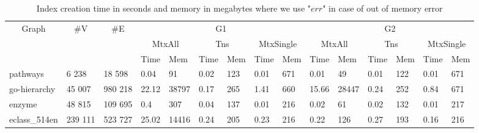 {\setlength{\tabcolsep}{0.25em}
	\begin{table}[t]
		{
			\caption{Index creation time in seconds and memory in megabytes where we use "$err$" in case of out of memory error }
			\label{tbl:index_creation}
			\small
			\begin{tabular}{|l|l|l|l|l|l|l|l|l|l|l|l|l|l|l|}
				\hline
				\multicolumn{1}{|c}{\multirow{3}{*}{Graph}} &
				\multicolumn{1}{|c}{\multirow{3}{*}{\#V}} &
				\multicolumn{1}{|c|}{\multirow{3}{*}{\#E}} & \multicolumn{6}{c|}{G1}                                                           & \multicolumn{6}{c|}{G2}                                                                                                               \\ \cline{4-15}
				\multicolumn{1}{|c}{}                       &
				\multicolumn{1}{|c}{}                       &
				\multicolumn{1}{|c|}{}                       & \multicolumn{2}{c|}{MtxAll} & \multicolumn{2}{c|}{Tns} & \multicolumn{2}{c|}{MtxSingle} & \multicolumn{2}{c|}{MtxAll} & \multicolumn{2}{c|}{Tns} & \multicolumn{2}{c|}{MtxSingle} \\ \cline{4-15}
				\multicolumn{1}{|c}{}                       &
				\multicolumn{1}{|c}{}                       &
				\multicolumn{1}{|c|}{}                       & Time          & Mem         & Time        & Mem        & Time        & Mem        & Time          & Mem         & Time        & Mem        & Time        & Mem     \\ \hline \hline
				pathways  & 6 238 & 18 598                                   & 0.04          & 91          & 0.02        & 123        & 0.01        & 671        & 0.01          & 49          & 0.01        & 122        & 0.01        & 671   \\ \hline
				go-hierarchy & 45 007 & 980 218                                & 22.12         & 38797       & 0.17        & 265        & 1.41        & 660        & 15.66         & 28447       & 0.24        & 252        & 0.84        & 671   \\ \hline
				enzyme       & 48 815 & 109 695                                & 0.4           & 307         & 0.04        & 137        & 0.01        & 216        & 0.02          & 61          & 0.02        & 132        & 0.01        & 217   \\ \hline
				eclass\_514en   & 239 111 & 523 727                             & 25.02         & 14416       & 0.24        & 205        & 0.23        & 216        & 0.22          & 126         & 0.27        & 193        & 0.16        & 216   \\ \hline

\end{tabular}}
\end{table}}
